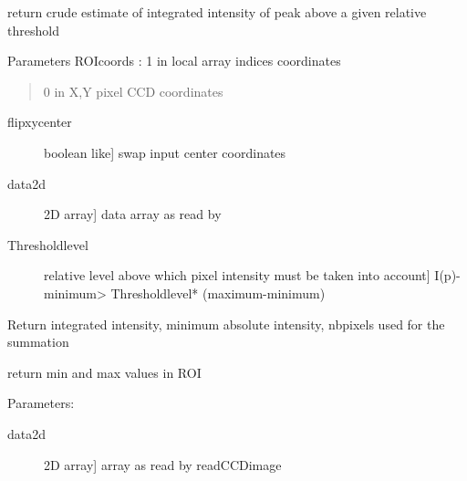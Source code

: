 \documentclass[letterpaper,10pt,english]{sphinxmanual}
\begin{document}

\begin{fulllineitems}
\label{\detokenize{PeakSearch:LaueTools.readmccd.getIntegratedIntensity}}
return  crude estimate of integrated intensity of peak above a given relative threshold

Parameters
ROIcoords : 1 in local array indices coordinates
\begin{quote}

0 in X,Y pixel CCD coordinates
\end{quote}
\begin{description}
\item[{flipxycenter}] \leavevmode{[}boolean like{]}
swap input center coordinates

\item[{data2d}] \leavevmode{[}2D array{]}
data array as read by {\hyperref[\detokenize{PeakSearch:LaueTools.readmccd.readCCDimage}]{}}

\item[{Thresholdlevel}] \leavevmode{[}relative level above which pixel intensity must be taken into account{]}
I(p)- minimum\textgreater{} Thresholdlevel* (maximum-minimum)

\end{description}

Return
integrated intensity, minimum absolute intensity, nbpixels used for the summation

\end{fulllineitems}


\begin{fulllineitems}
\label{\detokenize{PeakSearch:LaueTools.readmccd.getMinMax}}
return min and max values in ROI

Parameters:
\begin{description}
\item[{data2d}] \leavevmode{[}2D array{]}
array as read by readCCDimage

\end{description}

\end{fulllineitems}
\end{document}
